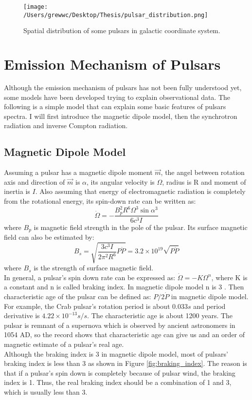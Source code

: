 \documentclass[12pt]{report}
\begin{document}
    \begin{figure}[h]
      \centering
      \texttt{[image: /Users/grewwc/Desktop/Thesis/pulsar\_distribution.png]}
      \caption{Spatial distribution of some pulsars in galactic coordinate system.}
      \label{fig: spatial_distribution}
    \end{figure}
    
    \section{Emission Mechanism of Pulsars}
      Although the emission mechanism of pulsars has not been fully understood yet, some 
      models have been developed 
      trying to explain observational data. The following is a simple model that can explain 
      some basic features of pulsars spectra. I will first introduce the magnetic dipole model, 
      then the synchrotron radiation and inverse Compton radiation. 
      
      \subsection{Magnetic Dipole Model}
        Assuming a pulsar has a magnetic dipole moment $\vec{m}$, the angel between rotation axis and 
        direction of 
        $\vec{m}$ is $\alpha$, its angular velocity is $\Omega$, radius is R and moment of inertia is $I$. 
        Also assuming that energy of electromagnetic radiation is completely from the rotational energy, 
        its spin-down rate can be written as: 
        $$
            \dot{\Omega}=-\frac{B_p^2 R^6 \Omega^3 \sin{\alpha}^3}{6c^3I}
        $$
        where $B_p$ is magnetic field strength in the pole of the pulsar. Its surface magnetic field can 
        also be estimated by:
        $$
            B_s=\sqrt{\frac{3c^3I}{2\pi^2R^6}P\dot{P}}=3.2\times 10^{19}\sqrt{P\dot{P}}
        $$
        where $B_s$ is the strength of surface magnetic field. \\
        \indent In general, a pulsar's spin down rate can be expressed as: $\dot{\Omega}=-K\Omega^{n}$, 
        where K is a constant and n is called braking index. In magnetic dipole model n is 
        3 \cite{Tong2015}. Then characteristic age of the pulsar can be defined as: 
        $P/2\dot{P}$ in magnetic dipole model. For example, the Crab 
        pulsar's rotation period is about $0.033s$ and period derivative is 
        $4.22\times 10^{-13}s/s$. The characteristic age is about 1200 years. The pulsar 
        is remnant of a supernova which is observed by ancient astronomers in 1054 
        AD, so the record shows that characteristic age can give us and an order of magnetic 
        estimate of a pulsar's real age. \\
        \indent 
        Although the braking index is 3 in magnetic dipole model, most of pulsars' braking 
        index is less than 3 as shown in Figure \ref{fig:braking_index}. The reason is that if
        a pulsar's spin down is completely because of pulsar wind, the braking index is 1. 
        Thus, the real braking index should be a combination of 1 and 3, which is usually 
        less than 3. \cite{PhysRevD.91.063007}
        
\end{document}
